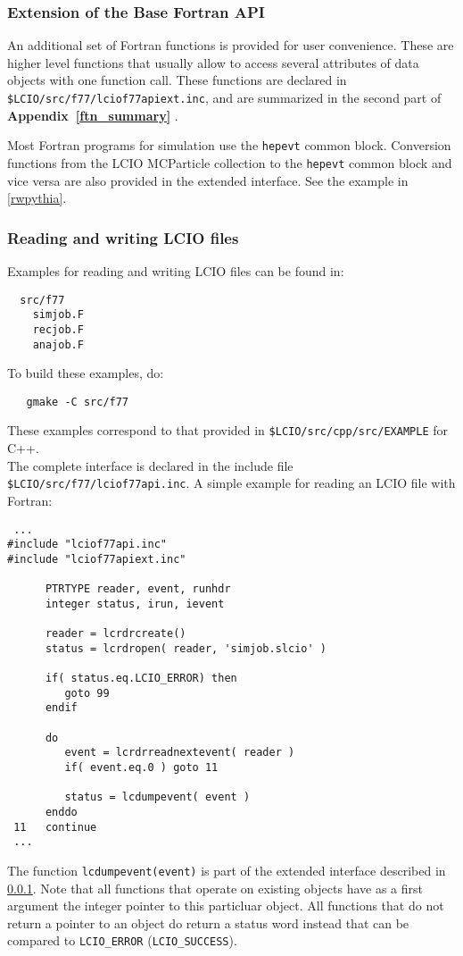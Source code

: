 \subsubsection{Extension of the Base Fortran API} \label{f77ext}

An additional set of Fortran functions is provided for user convenience. These are higher level functions
that usually allow to access several attributes of data objects with one function call.
These functions are declared in \verb#$LCIO/src/f77/lciof77apiext.inc#,
and are summarized in the second part of {\bf Appendix~\ref{ftn_summary} }.

Most Fortran programs for simulation use the \verb$hepevt$ common block. 
Conversion functions from the LCIO MCParticle collection to the \verb$hepevt$ common block and vice versa 
are also provided in the extended interface. See the example in \ref{rwpythia}.

\subsubsection{Reading and writing LCIO files}

Examples for reading and writing LCIO files can be found in:
\begin{verbatim}
  src/f77
    simjob.F
    recjob.F
    anajob.F
\end{verbatim}
To build these examples, do:
\begin{verbatim}
   gmake -C src/f77
\end{verbatim}

These examples correspond to that provided in \verb#$LCIO/src/cpp/src/EXAMPLE# for C++. \\
                                                                                       
The complete interface is declared in the include file \verb#$LCIO/src/f77/lciof77api.inc#. 
A simple example for reading an LCIO file with Fortran:

\begin{verbatim}
 ...
#include "lciof77api.inc"
#include "lciof77apiext.inc"

      PTRTYPE reader, event, runhdr
      integer status, irun, ievent

      reader = lcrdrcreate()
      status = lcrdropen( reader, 'simjob.slcio' )
      
      if( status.eq.LCIO_ERROR) then
         goto 99
      endif

      do 
         event = lcrdrreadnextevent( reader )
         if( event.eq.0 ) goto 11 
         
         status = lcdumpevent( event )
      enddo
 11   continue
 ...
\end{verbatim}
The function \verb$lcdumpevent(event)$ is part of the extended interface described in \ref{f77ext}.
Note that all functions that operate on existing objects have as a first argument the integer pointer 
to this particluar object.
All functions that do not return a pointer to an object do return a status word instead that can be 
compared to \verb$LCIO_ERROR$ (\verb$LCIO_SUCCESS$).

